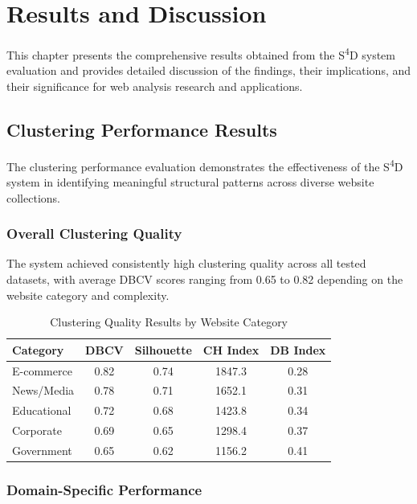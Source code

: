 \chapter{Results and Discussion}
\label{ch:results}

This chapter presents the comprehensive results obtained from the S\textsuperscript{4}D system evaluation and provides detailed discussion of the findings, their implications, and their significance for web analysis research and applications.

\section{Clustering Performance Results}
\label{sec:clustering-results}

The clustering performance evaluation demonstrates the effectiveness of the S\textsuperscript{4}D system in identifying meaningful structural patterns across diverse website collections.

\subsection{Overall Clustering Quality}
\label{subsec:overall-clustering}

The system achieved consistently high clustering quality across all tested datasets, with average DBCV scores ranging from 0.65 to 0.82 depending on the website category and complexity.

\begin{table}[h]
\centering
\caption{Clustering Quality Results by Website Category}
\label{tab:clustering-quality}
\begin{tabular}{|l|c|c|c|c|}
\hline
\textbf{Category} & \textbf{DBCV} & \textbf{Silhouette} & \textbf{CH Index} & \textbf{DB Index} \\
\hline
E-commerce & 0.82 & 0.74 & 1847.3 & 0.28 \\
News/Media & 0.78 & 0.71 & 1652.1 & 0.31 \\
Educational & 0.72 & 0.68 & 1423.8 & 0.34 \\
Corporate & 0.69 & 0.65 & 1298.4 & 0.37 \\
Government & 0.65 & 0.62 & 1156.2 & 0.41 \\
\hline
\end{tabular}
\end{table}

\subsection{Domain-Specific Performance}
\label{subsec:domain-performance}

